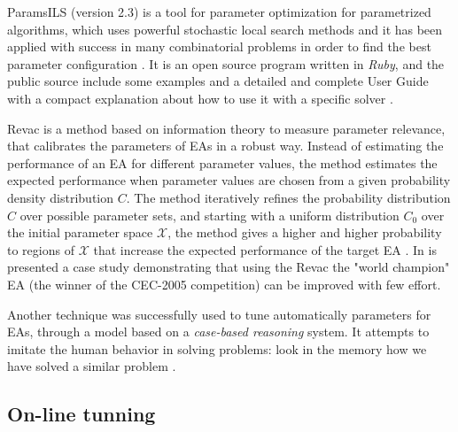 {\sc ParamsILS} (version 2.3) is a tool for parameter optimization for parametrized algorithms, which uses powerful stochastic local search methods and it has been applied with success in many combinatorial problems in order to find the best parameter configuration \cite{Hutter2009}. It is an open source program written in {\it Ruby}, and the public source include some examples and a detailed and complete User Guide with a compact explanation about how to use it with a specific solver \cite{Hutter2008}.

{\sc Revac} is a method based on information theory to measure parameter relevance, that calibrates the parameters of EAs in a robust way. Instead of estimating the performance of an EA for different parameter values, the method estimates the expected performance when parameter values are chosen from a given probability density distribution $C$. The method iteratively refines the probability distribution $C$ over possible parameter sets, and starting with a uniform distribution $C_0$ over the initial parameter space $\mathcal{X}$, the method gives a higher and higher probability to regions of $\mathcal{X}$ that increase the expected performance of the target EA \cite{Nannen2007}. In \cite{Smit2010} is presented a case study demonstrating that using the {\sc Revac} the "world champion" EA (the winner of the CEC-2005 competition) can be improved with few effort.

Another technique was successfully used to tune automatically parameters for EAs, through a model based on a {\it case-based reasoning} system. It attempts to imitate the human behavior in solving problems: look in the memory how we have solved a similar problem \cite{Yeguas2014} .

\subsection{On-line tunning}

